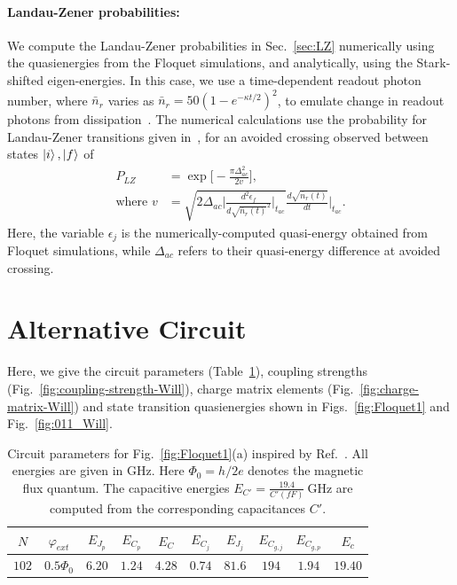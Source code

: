 \documentclass[%
reprint,
superscriptaddress,
 amsmath,amssymb,
 aps,
 prx,
longbibliography,
floatfix,
]{revtex4-2}
\begin{document}
\paragraph{Landau-Zener probabilities:}\label{app:LZ}
We compute the Landau-Zener probabilities in Sec.~\ref{sec:LZ} numerically using the quasienergies from the Floquet simulations, and analytically, using the Stark-shifted eigen-energies. In this case, we use a time-dependent readout photon number, where $\bar n_r$ varies as $\bar n_r=50(1-e^{-\kappa t/2})^2$, to emulate change in readout photons from dissipation~\cite{dumas2024unifie,khezri2023measurement}. The numerical calculations use the probability for Landau-Zener transitions given in~\cite{ikeda2022floquet}, for an avoided crossing observed between states $\ket{i},\ket{f}$ of
\begin{align}
    P_{LZ}&=\exp{\Big[-\frac{\pi \Delta_{ac}^2}{2v}\Big]},\\
    \text{where } v&=\sqrt{2\Delta_{ac}\Big|\frac{d^2\epsilon_f}{d\sqrt{\bar{n}_r(t)}^2}\Big|_{t_{ac}}}\frac{d\sqrt{\bar{n}_r(t)}}{dt}|_{t_{ac}}\Big .
\end{align}
Here, the variable $\epsilon_j$ is the numerically-computed quasi-energy obtained from Floquet simulations, while $\Delta_{ac}$ refers to their quasi-energy difference at avoided crossing. 

\section{Alternative Circuit}\label{app:alt_circuit1}
Here, we give the circuit parameters (Table~\ref{tab:circuit_params_Will}), coupling strengths (Fig.~\ref{fig:coupling-strength-Will}), charge matrix elements (Fig.~\ref{fig:charge-matrix-Will}) and state transition quasienergies shown in Figs.~\ref{fig:Floquet1} and Fig.~\ref{fig:011_Will}. 
\begin{table}[htb]
\centering
\begin{tabular}{|c|c|c|c|c|c|c|c|c|c|}
    \hline
     $N$ & $\varphi_{ext}$ & $E_{J_p}$ & $E_{C_p}$ & $E_C$ & $E_{C_j}$ & $E_{J_j}$ & $E_{C_{g,j}}$ & $E_{C_{g,p}}$ & $E_c$ \\
    \hline
    $102$ & $0.5\Phi_0$ & $6.20$ & $1.24$ & $4.28$ & $0.74$ & $81.6$ & $194$ & $1.94$ & $19.40$ \\
    \hline
\end{tabular}
\caption{Circuit parameters for Fig.~\ref{fig:Floquet1}(a) inspired by Ref.~\cite{ding_high-fidelity_2023}. All energies are given in GHz. Here $\Phi_0=h/2e$ denotes the magnetic flux quantum. The capacitive energies $E_{C'}=\frac{19.4}{{C'}(fF)} \ \mathrm{GHz}$ are computed from the corresponding capacitances $C'$.}
\label{tab:circuit_params_Will}
\end{table}
\end{document}
